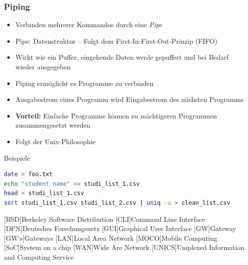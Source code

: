 \documentclass[xcolor=dvipsnames,aspectratio=169]{beamer}
\begin{document}
\begin{frame}
	\frametitle{Piping}
\begin{itemize}
	\item Verbinden mehrerer Kommandos durch eine \emph{Pipe}
	\item Pipe: Datenstruktur -- Folgt dem First-In-First-Out-Prinzip (FIFO)
	\item Wirkt wie ein Puffer, eingehende Daten werde gepuffert und bei Bedarf wieder ausgegeben
	\item Piping ermöglicht es Programme zu verbinden
	\item Ausgabestrom eines Programm wird Eingabestrom des nächsten Programms
	\item \textbf{Vorteil:} Einfache Programme können zu mächtigeren Programmen zusammengesetzt werden
	\item Folgt der Unix-Philosophie
\end{itemize}
\end{frame}

\begin{frame}[fragile]{Beispiele}
	\begin{lstlisting}[style=Bash, language=Bash]
date > foo.txt
echo "student name" >> studi_list_1.csv
head < studi_list_1.csv
sort studi_list_1.csv studi_list_2.csv | uniq -u > clean_list.csv
	\end{lstlisting}
\end{frame}

\begin{acronym}
[BSD]{Berkeley Software Distribution}
[CLI]{Command Line Interface}
[DFN]{Deutsches Forschungsnetz}
[GUI]{Graphical User Interface}
[GW]{Gateway}
[GW`s]{Gateways}
[LAN]{Local Area Network}
[MOCO]{Mobile Computing}
[SoC]{System on a chip}
[WAN]{Wide Are Network}
[UNICS]{Uniplexed Information and Computing Service}
\end{acronym}
\end{document}
